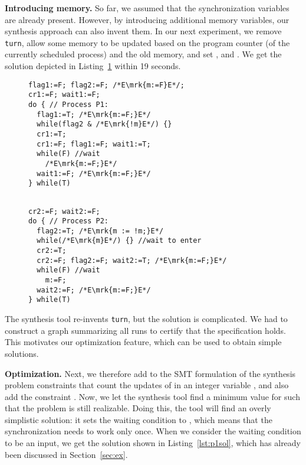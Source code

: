 \textbf{Introducing memory.}
So far, we assumed that the synchronization variables are already present. 
However, by introducing additional memory variables, our synthesis approach can 
also invent them. In our next experiment, we remove \texttt{turn}, allow some 
memory  to be updated based on the program counter (of the currently 
scheduled process) and the old memory, and set 
\mrk{\ctrl}, and 
\mrk{\ctrl}.  We get the solution 
depicted in Listing~\ref{lst:p1solmem} within 19 seconds.
\begin{figure}[tb]
\label{lst:p1solmem}
\vspace{-0.4cm}
\begin{minipage}{0.44\textwidth}
\begin{lstlisting}[firstnumber=0]
                   flag1:=F; flag2:=F; /*E\mrk{m:=F}E*/;
cr1:=F; wait1:=F;
do { // Process P1:
  flag1:=T; /*E\mrk{m:=F;}E*/
  while(flag2 & /*E\mrk{!m}E*/) {}
  cr1:=T;
  cr1:=F; flag1:=F; wait1:=T;
  while(F) //wait
    /*E\mrk{m:=F;}E*/
  wait1:=F; /*E\mrk{m:=F;}E*/
} while(T)
\end{lstlisting}
\end{minipage}
\hspace{0.1cm}
\begin{minipage}{0.54\textwidth}
\begin{lstlisting}[firstnumber=20]

cr2:=F; wait2:=F;
do { // Process P2:
  flag2:=T; /*E\mrk{m := !m;}E*/
  while(/*E\mrk{m}E*/) {} //wait to enter
  cr2:=T;
  cr2:=F; flag2:=F; wait2:=T; /*E\mrk{m:=F;}E*/
  while(F) //wait
    m:=F;
  wait2:=F; /*E\mrk{m:=F;}E*/
} while(T)
\end{lstlisting}
\end{minipage}
\end{figure}
The synthesis tool re-invents \texttt{turn}, but the solution is
complicated.  We had to construct a graph summarizing all runs to certify that
the specification holds.  This motivates our optimization feature, which can
be used to obtain simple solutions.

\textbf{Optimization.}
Next, we therefore add to the SMT formulation of the synthesis problem
constraints that count the updates of  in an integer variable , and also
add the constraint .  Now, we let the synthesis tool find a
minimum value for  such that the problem is still realizable.
Doing this, the tool will find an overly simplistic solution: it sets the
waiting condition \mrk{\ctrl} to , which means that the
synchronization needs to work only once.  When we consider the waiting 
condition to be an
input, we get the solution shown in Listing~\ref{lst:p1sol}, which has already
been discussed in Section~\ref{sec:ex}.

